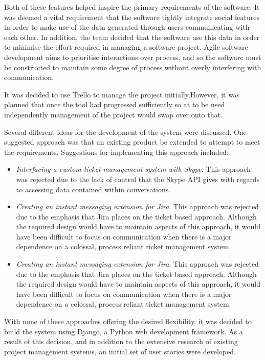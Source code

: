 \documentclass[a4paper]{l3proj}
\begin{document}
  Both of these features helped inspire the primary requirements of the software. It was deemed a vital requirement that the software tightly integrate social features in order to make use of the data generated through users communicating with each other. In addition, the team decided that the software use this data in order to minimise the effort required in managing a software project. Agile software development aims to prioritise interactions over process, and so the software must be constructed to maintain some degree of process without overly interfering with communication.

  It was decided to use Trello to manage the project initially.However, it was planned that once the tool had progressed sufficiently so at to be used independently management of the project would swap over onto that.

  Several different ideas for the development of the system were discussed. One suggested approach was that an existing product be extended to attempt to meet the requirements. Suggestions for implementing this approach included:

  \begin{itemize}
    \item \textit{Interfacing a custom ticket management system with Skype}. This approach was rejected due to the lack of control that the Skype API gives with regards to accessing data contained within conversations.
    \item \textit{Creating an instant messaging extension for Jira}. This approach was rejected due to the emphasis that Jira places on the ticket based approach. Although the required design would have to maintain aspects of this approach, it would have been difficult to focus on communication when there is a major dependence on a colossal, process reliant ticket management system.

    \item \textit{Creating an instant messaging extension for Jira}. This approach was rejected due to the emphasis that Jira places on the ticket based approach. Although the required design would have to maintain aspects of this approach, it would have been difficult to focus on communication when there is a major dependence on a colossal, process reliant ticket management system.

  \end{itemize}

  With none of these approaches offering the desired flexibility, it was decided to build the system using Django, a Python web development framework.  As a result of this decision, and in addition to the extensive research of existing project management systems, an initial set of user stories were developed.
\end{document}
